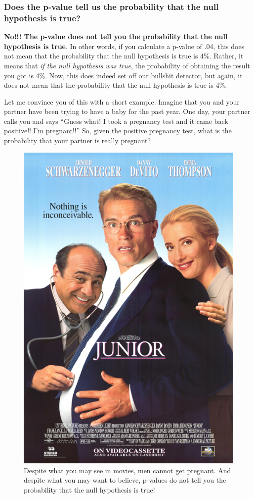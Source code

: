 \documentclass[]{book}
\theoremstyle{definition}
\theoremstyle{definition}
\theoremstyle{remark}
\begin{document}
\subsubsection{Does the p-value tell us the probability that the null
hypothesis is
true?}\label{does-the-p-value-tell-us-the-probability-that-the-null-hypothesis-is-true}

\textbf{No!!! The p-value does not tell you the probability that the
null hypothesis is true}. In other words, if you calculate a p-value of
.04, this does not mean that the probability that the null hypothesis is
true is 4\%. Rather, it means that \emph{if the null hypothesis was
true}, the probability of obtaining the result you got is 4\%. Now, this
does indeed set off our bullshit detector, but again, it does not mean
that the probability that the null hypothesis is true is 4\%.

Let me convince you of this with a short example. Imagine that you and
your partner have been trying to have a baby for the past year. One day,
your partner calls you and says ``Guess what! I took a pregnancy test
and it came back positive!! I'm pregnant!!'' So, given the positive
pregnancy test, what is the probability that your partner is really
pregnant?

\begin{figure}

{\centering \includegraphics[width=0.4\linewidth]{images/juniorposter} 

}

\caption{Despite what you may see in movies, men cannot get pregnant. And despite what you may want to believe, p-values do not tell you the probability that the null hypothesis is true!}\label{fig:unnamed-chunk-339}
\end{figure}
\end{document}
